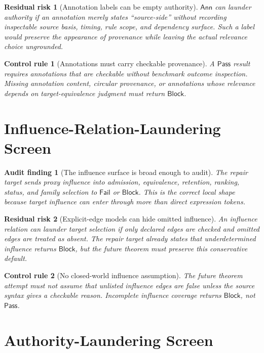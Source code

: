 \documentclass[11pt]{article}
\newcommand{\Annot}{\mathsf{Ann}}
\newcommand{\Pass}{\mathsf{Pass}}
\newcommand{\Fail}{\mathsf{Fail}}
\newcommand{\Block}{\mathsf{Block}}
\newtheorem{auditfinding}{Audit finding}
\newtheorem{residualrisk}{Residual risk}
\newtheorem{controlrule}{Control rule}
\begin{document}
\begin{residualrisk}[Annotation labels can be empty authority]
\(\Annot\) can launder authority if an annotation merely states
``source-side'' without recording inspectable source basis, timing, rule
scope, and dependency surface. Such a label would preserve the appearance of
provenance while leaving the actual relevance choice ungrounded.
\end{residualrisk}

\begin{controlrule}[Annotations must carry checkable provenance]
A \(\Pass\) result requires annotations that are checkable without benchmark
outcome inspection. Missing annotation content, circular provenance, or
annotations whose relevance depends on target-equivalence judgment must
return \(\Block\).
\end{controlrule}

\section{Influence-Relation-Laundering Screen}

\begin{auditfinding}[The influence surface is broad enough to audit]
The repair target sends proxy influence into admission, equivalence,
retention, ranking, status, and family selection to \(\Fail\) or
\(\Block\). This is the correct local shape because target influence can
enter through more than direct expression tokens.
\end{auditfinding}

\begin{residualrisk}[Explicit-edge models can hide omitted influence]
An influence relation can launder target selection if only declared edges
are checked and omitted edges are treated as absent. The repair target
already states that underdetermined influence returns \(\Block\), but the
future theorem must preserve this conservative default.
\end{residualrisk}

\begin{controlrule}[No closed-world influence assumption]
The future theorem attempt must not assume that unlisted influence edges are
false unless the source syntax gives a checkable reason. Incomplete
influence coverage returns \(\Block\), not \(\Pass\).
\end{controlrule}

\section{Authority-Laundering Screen}
\end{document}
